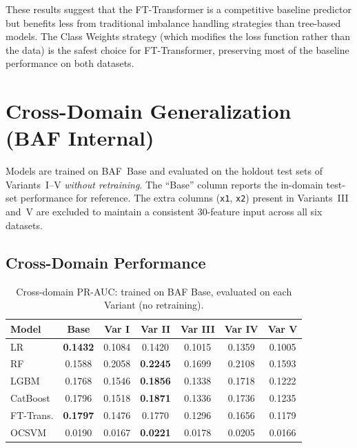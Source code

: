 These results suggest that the FT-Transformer is a competitive baseline predictor but benefits less from traditional imbalance handling strategies than tree-based models.
The Class Weights strategy (which modifies the loss function rather than the data) is the safest choice for FT-Transformer, preserving most of the baseline performance on both datasets.



\section{Cross-Domain Generalization (BAF Internal)}
\label{sec:cross_domain_results}

Models are trained on BAF~Base and evaluated on the holdout test sets
of Variants~I--V \emph{without retraining}.
The ``Base'' column reports the in-domain test-set performance for reference.
The extra columns (\texttt{x1}, \texttt{x2}) present in Variants~III
and~V are excluded to maintain a consistent 30-feature input across
all six datasets.

\subsection{Cross-Domain Performance}

\begin{table}[ht!]
\centering
\caption{Cross-domain PR-AUC: trained on BAF Base, evaluated on each Variant (no retraining).}
\label{tab:crossdomain_prauc}
\begin{tabular}{l c c c c c c}
\toprule
Model & Base & Var I & Var II & Var III & Var IV & Var V \\
\midrule
LR         & \textbf{0.1432} & 0.1084 & 0.1420 & 0.1015 & 0.1359 & 0.1005 \\
RF         & 0.1588 & 0.2058 & \textbf{0.2245} & 0.1699 & 0.2108 & 0.1593 \\
LGBM       & 0.1768 & 0.1546 & \textbf{0.1856} & 0.1338 & 0.1718 & 0.1222 \\
CatBoost   & 0.1796 & 0.1518 & \textbf{0.1871} & 0.1336 & 0.1736 & 0.1235 \\
FT-Trans.  & \textbf{0.1797} & 0.1476 & 0.1770 & 0.1296 & 0.1656 & 0.1179 \\
OCSVM      & 0.0190 & 0.0167 & \textbf{0.0221} & 0.0178 & 0.0205 & 0.0166 \\
\bottomrule
\end{tabular}
\end{table}

